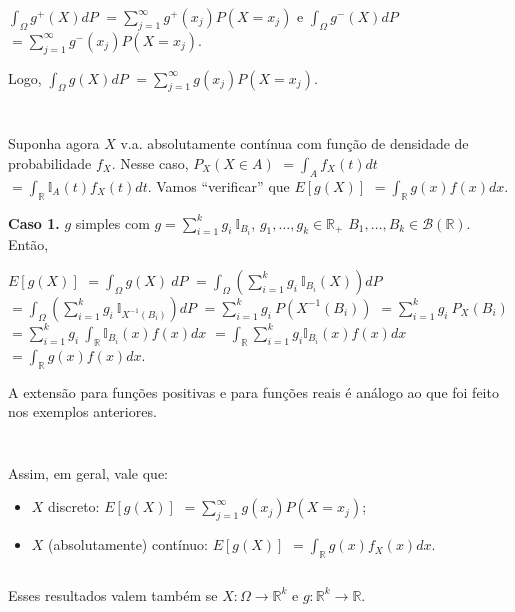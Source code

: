 \documentclass[
]{book}
\begin{document}
\(\displaystyle\int_\Omega g^+(X)dP\) \(=\displaystyle\sum_{j=1}^\infty g^+(x_j)P(X = x_j)\) e \(\displaystyle\int_\Omega g^-(X)dP\) \(=\displaystyle\sum_{j=1}^\infty g^-(x_j)P(X = x_j)\).

Logo, \(\displaystyle\int_\Omega g(X)dP\) \(=\displaystyle\sum_{j=1}^\infty g(x_j)P(X = x_j)\).

\(~\)

\(~\)

Suponha agora \(X\) v.a. absolutamente contínua com função de densidade de probabilidade \(f_X\). Nesse caso, \(P_X(X\in A)\) \(=\displaystyle\int_Af_X(t)dt\) \(=\displaystyle\int_{\mathbb{R}}\mathbb{I}_A(t)f_X(t)dt\). Vamos ``verificar'' que \(E\left[g(X)\right]\) \(=\displaystyle\int_{\mathbb{R}} g(x)f(x)dx\).

\textbf{Caso 1.} \(g\) simples com \(g = \displaystyle\sum_{i=1}^kg_i~\mathbb{I}_{B_i}\), \(g_1,\ldots,g_k \in \mathbb{R}_+\) \(B_1,\ldots,B_k \in \mathcal{B}(\mathbb{R})\). Então,

\(E\left[g(X)\right]\) \(=\displaystyle\int_\Omega g(X)~dP\)
\(=\displaystyle\int_\Omega\left(\sum_{i=1}^k g_i~\mathbb{I}_{B_i}(X)\right)dP\)
\(=\displaystyle\int_\Omega\left(\sum_{i=1}^k g_i~\mathbb{I}_{X^{-1}(B_i)}\right)dP\)
\(=\displaystyle\sum_{i=1}^k g_i~P(X^{-1}(B_i))\)
\(=\displaystyle\sum_{i=1}^k g_i~P_X(B_i)\)
\(=\displaystyle\sum_{i=1}^k g_i~\int_{\mathbb{R}}\mathbb{I}_{B_i}(x)f(x)dx\)
\(=\displaystyle\int_{\mathbb{R}}\sum_{i=1}^k g_i\mathbb{I}_{B_i}(x)f(x)dx\)
\(=\displaystyle\int_{\mathbb{R}}g(x)f(x)dx\).

A extensão para funções positivas e para funções reais é análogo ao que foi feito nos exemplos anteriores.

\(~\)

\(~\)

Assim, em geral, vale que:

\begin{itemize}
\item
  \(X\) discreto: \(E[g(X)]\) \(=\displaystyle\sum_{j=1}^\infty g(x_j)P(X=x_j)\);
\item
  \(X\) (absolutamente) contínuo: \(E[g(X)]\) \(=\displaystyle\int_{\mathbb{R}}g(x)f_X(x)dx\).
\end{itemize}

\(~\)

Esses resultados valem também se \(X: \Omega \longrightarrow \mathbb{R}^k\) e \(g: \mathbb{R}^k\longrightarrow \mathbb{R}.\)

\(~\)

\(~\)
\end{document}
